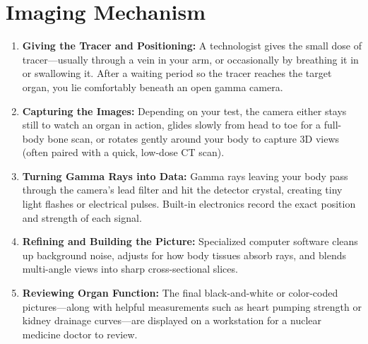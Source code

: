 \section{Imaging Mechanism}
\begin{enumerate}
\item \textbf{Giving the Tracer and Positioning:} A technologist gives the small dose of tracer---usually through a vein in your arm, or occasionally by breathing it in or swallowing it. After a waiting period so the tracer reaches the target organ, you lie comfortably beneath an open gamma camera.
\item \textbf{Capturing the Images:} Depending on your test, the camera either stays still to watch an organ in action, glides slowly from head to toe for a full-body bone scan, or rotates gently around your body to capture 3D views (often paired with a quick, low-dose CT scan).
\item \textbf{Turning Gamma Rays into Data:} Gamma rays leaving your body pass through the camera's lead filter and hit the detector crystal, creating tiny light flashes or electrical pulses. Built-in electronics record the exact position and strength of each signal.
\item \textbf{Refining and Building the Picture:} Specialized computer software cleans up background noise, adjusts for how body tissues absorb rays, and blends multi-angle views into sharp cross-sectional slices.
\item \textbf{Reviewing Organ Function:} The final black-and-white or color-coded pictures---along with helpful measurements such as heart pumping strength or kidney drainage curves---are displayed on a workstation for a nuclear medicine doctor to review.
\end{enumerate}


